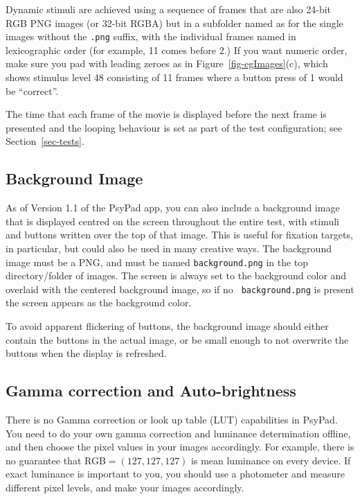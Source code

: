 \documentclass{article}
\begin{document}
Dynamic stimuli are achieved using a sequence of frames that are also
24-bit RGB PNG images (or 32-bit RGBA) but in a subfolder named as for the single 
images without the {\tt .png} suffix, with the individual frames 
named in lexicographic order (for example, 11 comes before 2.) If you want
numeric order, make sure you pad with leading zeroes as in Figure~\ref{fig-egImages}(c),
which shows 
stimulus level 48 consisting of 11 frames where a button
press of 1 would be ``correct''.

The time that each frame of the movie is displayed before the next frame is
presented and the looping behaviour is set as part of the test configuration;
see Section~\ref{sec-tests}.

\subsection{Background Image}
\label{sect-bi}

As of Version 1.1 of the PsyPad app, you can also include a background
image that is displayed centred on the screen throughout the entire
test, with stimuli and buttons written over the top of that image.
This is useful for fixation targets, in particular, but could also
be used in many creative ways.  The background image must be a PNG,
and must be named {\tt background.png} in the top directory/folder
of images.  The screen is always set to the background color and
overlaid with the centered background image, so if no {\tt
background.png} is present the screen appears as the background
color.

To avoid apparent flickering of buttons, the background image should
either contain the buttons in the actual image, or be small enough
to not overwrite the buttons when the display is refreshed.

\subsection{Gamma correction and Auto-brightness}

There is no Gamma correction or look up table (LUT) capabilities in PsyPad.
You need to do your own gamma correction and luminance determination offline, and then
choose the pixel values in your images accordingly.
For example, there is no guarantee that RGB$=(127,127,127)$ 
is mean luminance on every device. If
exact luminance is important to you, you should use a photometer and measure different
pixel levels, and make your images accordingly.
\end{document}
